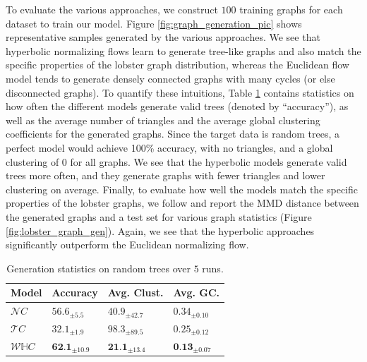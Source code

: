 To evaluate the various approaches, we construct $100$ training graphs for each dataset to train our model.
Figure \ref{fig:graph_generation_pic} shows representative samples generated by the various approaches.
We see that hyperbolic normalizing flows learn to generate tree-like graphs and also match the specific properties of the lobster graph distribution, whereas the Euclidean flow model tends to generate densely connected graphs with many cycles (or else disconnected graphs). 
To quantify these intuitions, Table \ref{tab:randtrees} contains statistics on how often the different models generate valid trees (denoted by ``accuracy''), as well as the average number of triangles and the average global clustering coefficients for the generated graphs. 
Since the target data is random trees, a perfect model would achieve 100\% accuracy, with no triangles, and a global clustering of 0 for all graphs. 
We see that the hyperbolic models generate valid trees more often, and they generate graphs with fewer triangles and lower clustering on average.
Finally, to evaluate how well the models match the specific properties of the lobster graphs, we follow \cite{liao2019efficient} and report the MMD distance between the generated graphs and a test set for various graph statistics (Figure \ref{fig:lobster_graph_gen}).
Again, we see that the hyperbolic approaches significantly outperform the Euclidean normalizing flow. 

\begin{table}[]
\label{graph_gen_table}
\begin{center}
\begin{tabular}{llll}
    \toprule
    Model   & Accuracy & Avg. Clust. & Avg. GC.\\
    \midrule
    $\mathcal{N}C$ & $56.6_{\pm 5.5}$ & $40.9_{\pm 42.7}$ & $0.34_{\pm0.10}$\\
    $\mathcal{T}C$ & $32.1_{\pm 1.9}$ & $98.3_{\pm 89.5}$ & $0.25_{\pm 0.12}$\\
    $\mathcal{W}\mathbb{H}C$ & $\textbf{62.1}_{\pm 10.9}$ & $\textbf{21.1}_{\pm 13.4}$ & $\textbf{0.13}_{\pm0.07}$\\
    \bottomrule
\end{tabular}
\end{center}
\caption{Generation statistics on random trees over $5$ runs.}
\label{tab:randtrees}
\vspace{-10pt}
\end{table}

